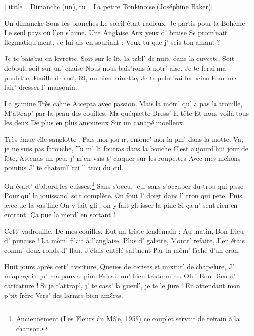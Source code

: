  [
ititle= {Dimanche (un)},
tu= {La petite Tonkinoise (Joséphine Baker)}]

\beginverse
Un dimanche
Sous les branches
Le soleil était radieux.
Je partis pour la Bohême
Le seul pays où l'on s'aime.
Une Anglaise
Aux yeux d' braise
Se prom'nait flegmatiqu'ment.
Je lui dis en souriant :
Veux-tu que j' sois ton amant ?
\endverse

\beginverse
Je te bais'rai en levrette,
Soit sur le lit, la tabl' de nuit, dans la cuvette,
Soit debout, soit sur un' chaise
Nous nous bais'rons à notr' aise.
Je te ferai ma poulette,
Feuille de ros', 69, ou bien minette,
Je te pelot'rai les seins
Pour me fair' dresser l' marsouin.
\endverse

\beginverse
La gamine
Très caline
Accepta avec passion.
Mais la môm' qu' a pas la trouille,
M'attrap' par la peau des couilles.
Ma quéquette
Dress' la tête
Et nous voilà tous les deux
De plus en plus amoureux
Sur un canapé moelleux.
\endverse

\beginverse
Très émue elle sanglotte :
Fais-moi jou-ir, enfonc'-moi la pin' dans la motte.
Va, je ne suis pas farouche,
Tu m' la foutras dans la bouche
C'est aujourd'hui jour de fête,
Attends un peu, j' m'en vais t' claquer sur les roupettes
Avec mes nichons pointus
J' te chatouill'rai l' trou du cul.
\endverse

\beginverse
On écart' d'abord les cuisses,\footnote {Anciennement (Les Fleurs du Mâle, 1958) ce couplet servait de refrain à la chanson.}
Sans s'occu, -cu, sans s'occuper du trou qui pisse
Pour qu' la jouissanc' soit complète,
On fout l' doigt dans l' trou qui pète.
Puis avec de la vas'line
On y fait gli-, on y fait gli-isser la pine
Si ça n' sent rien en entrant,
Ça pue la merd' en sortant !
\endverse

\beginverse
Cett' vadrouille,
De mes couilles,
Eut un triste lendemain :
Au matin, Bon Dieu d' punaise !
La môm' filait à l'anglaise.
Plus d' galette,
Montr' refaite,
J'en étais comm' deux ronds d' flan.
J'étais entôlé sal'ment
Par la môm' lâché d'un cran.
\endverse

\beginverse
Huit jours après cett' aventure,
Queues de cerises et mixtur' de chapelure,
J' m'aperçois qu' ma pauvre pine
Faisait un' bien triste mine.
Oh ! Bon Dieu d' caricature !
Si je t'attrap', j' te cass' la gueul', je te le jure !
En attendant mon p'tit frère
Vers' des larmes bien amêres.
\endverse

\endsong
